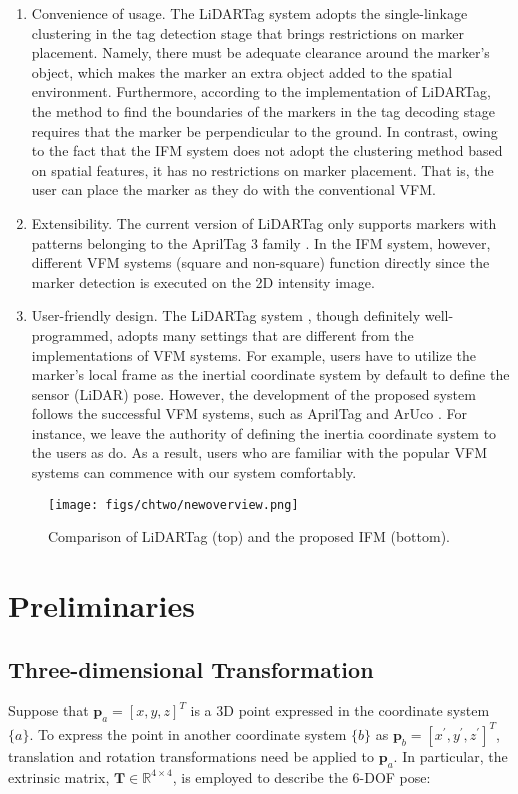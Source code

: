 \begin{enumerate}[label=(\roman*)]
	 \item Convenience of usage. The LiDARTag \cite{lt} system adopts the single-linkage clustering in the tag detection stage that brings restrictions on marker placement. Namely, there must be adequate clearance around the marker's object, which makes the marker an extra object added to the spatial environment.  Furthermore, according to the implementation of LiDARTag, the method to find the boundaries of the markers in the tag decoding stage requires that the marker be perpendicular to the ground. In contrast, owing to the fact that the IFM system does not adopt the clustering method based on spatial features, it has no restrictions on marker placement. That is, the user can place the marker as they do with the conventional VFM.
	\item Extensibility. The current version of LiDARTag only supports markers with patterns belonging to the AprilTag 3 family \cite{ap3}. In the IFM system, however, different VFM systems (square and non-square) function directly since the marker detection is executed on the 2D intensity image.
	\item User-friendly design. The LiDARTag system \cite{lt}, though definitely well-programmed, adopts many settings that are different from the implementations of VFM systems. For example, users have to utilize the marker's local frame as the inertial coordinate system by default to define the sensor (LiDAR) pose. However, the development of the proposed system follows the successful VFM systems, such as AprilTag \cite{ap3} and ArUco \cite{aruco}. For instance, we leave the authority of defining the inertia coordinate system to the users as \cite{ap3,aruco} do. As a result, users who are familiar with the popular VFM systems can commence with our system comfortably.
\end{enumerate}

\begin{figure}[H] 
	\centering
	\texttt{[image: figs/chtwo/newoverview.png]}
	\caption{Comparison of LiDARTag \cite{lt} (top) and the proposed IFM (bottom).
 }
	\label{tagoverview}
\end{figure}
%    

\section{Preliminaries} \label{pre}
\subsection{Three-dimensional Transformation} \label{threedimen}
Suppose that $\mathbf{p}_{a} = [x,y,z]^{T}$ is a 3D point expressed in the coordinate system $\{a\}$. To express the point in another coordinate system $\{b\}$ as $\mathbf{p}_{b} = [x^{\prime},y^{\prime},z^{\prime}]^{T}$, translation and rotation transformations need be applied to $\mathbf{p}_{a}$. In particular, the extrinsic matrix, $\mathbf{T}\in\mathbb{R}^{4\times4}$, is employed to describe the 6-DOF pose:

